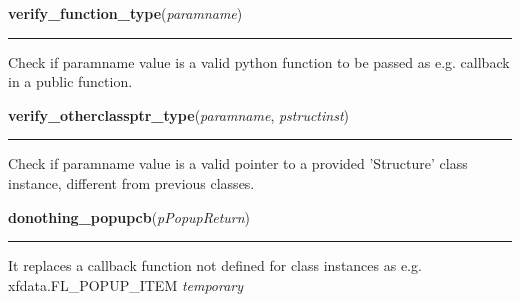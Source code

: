     \label{xformslib:library:verify_function_type}

    \vspace{0.5ex}

\hspace{.8\funcindent}\begin{boxedminipage}{\funcwidth}

    \raggedright \textbf{verify\_function\_type}(\textit{paramname})

    \vspace{-1.5ex}

    \rule{\textwidth}{0.5\fboxrule}
\setlength{\parskip}{2ex}

Check if paramname value is a valid python function to be passed as
e.g. callback in a public function.
\setlength{\parskip}{1ex}
    \end{boxedminipage}

    \label{xformslib:library:verify_otherclassptr_type}

    \vspace{0.5ex}

\hspace{.8\funcindent}\begin{boxedminipage}{\funcwidth}

    \raggedright \textbf{verify\_otherclassptr\_type}(\textit{paramname}, \textit{pstructinst})

    \vspace{-1.5ex}

    \rule{\textwidth}{0.5\fboxrule}
\setlength{\parskip}{2ex}

Check if paramname value is a valid pointer to a provided 'Structure'
class instance, different from previous classes.
\setlength{\parskip}{1ex}
    \end{boxedminipage}

    \label{xformslib:library:donothing_popupcb}

    \vspace{0.5ex}

\hspace{.8\funcindent}\begin{boxedminipage}{\funcwidth}

    \raggedright \textbf{donothing\_popupcb}(\textit{pPopupReturn})

    \vspace{-1.5ex}

    \rule{\textwidth}{0.5\fboxrule}
\setlength{\parskip}{2ex}

It replaces a callback function not defined for class instances
as e.g. xfdata.FL\_POPUP\_ITEM    \emph{temporary}
\setlength{\parskip}{1ex}
    \end{boxedminipage}

